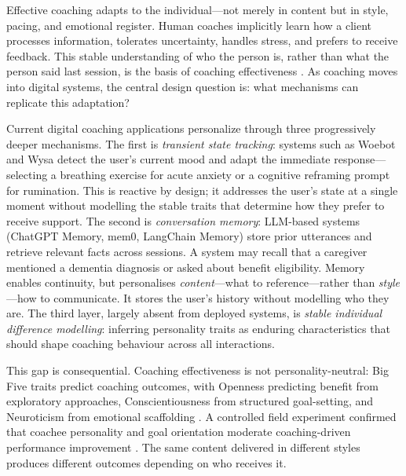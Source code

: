 \documentclass[10pt,a4paper]{report}
\begin{document}
Effective coaching adapts to the individual---not merely in content but in style, pacing, and emotional register. Human coaches implicitly learn how a client processes information, tolerates uncertainty, handles stress, and prefers to receive feedback. This stable understanding of who the person is, rather than what the person said last session, is the basis of coaching effectiveness \citep{Grant2003, Stober2006}. As coaching moves into digital systems, the central design question is: what mechanisms can replicate this adaptation?

Current digital coaching applications personalize through three progressively deeper mechanisms. The first is \emph{transient state tracking}: systems such as Woebot \citep{Fitzpatrick2017} and Wysa \citep{Inkster2018} detect the user's current mood and adapt the immediate response---selecting a breathing exercise for acute anxiety or a cognitive reframing prompt for rumination. This is reactive by design; it addresses the user's state at a single moment without modelling the stable traits that determine how they prefer to receive support. The second is \emph{conversation memory}: LLM-based systems (ChatGPT Memory, mem0, LangChain Memory) store prior utterances and retrieve relevant facts across sessions. A system may recall that a caregiver mentioned a dementia diagnosis or asked about benefit eligibility. Memory enables continuity, but personalises \emph{content}---what to reference---rather than \emph{style}---how to communicate. It stores the user's history without modelling who they are. The third layer, largely absent from deployed systems, is \emph{stable individual difference modelling}: inferring personality traits as enduring characteristics that should shape coaching behaviour across all interactions.

This gap is consequential. Coaching effectiveness is not personality-neutral: Big Five traits predict coaching outcomes, with Openness predicting benefit from exploratory approaches, Conscientiousness from structured goal-setting, and Neuroticism from emotional scaffolding \citep{deHaan2013, Jones2016}. A controlled field experiment confirmed that coachee personality and goal orientation moderate coaching-driven performance improvement \citep{Smither2019}. The same content delivered in different styles produces different outcomes depending on who receives it.
\end{document}
